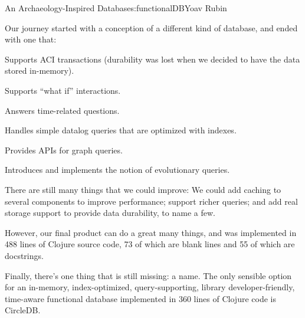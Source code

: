\begin{aosachapter}{An Archaeology-Inspired Database}{s:functionalDB}{Yoav Rubin}
\label{summary}

Our journey started with a conception of a different kind of database,
and ended with one that:

\begin{aosaitemize}

\item
  Supports ACI transactions (durability was lost when we decided to have
  the data stored in-memory).
\item
  Supports ``what if'' interactions.
\item
  Answers time-related questions.
\item
  Handles simple datalog queries that are optimized with indexes.
\item
  Provides APIs for graph queries.
\item
  Introduces and implements the notion of evolutionary queries.
\end{aosaitemize}

There are still many things that we could improve: We could add caching
to several components to improve performance; support richer queries;
and add real storage support to provide data durability, to name a few.

However, our final product can do a great many things, and was
implemented in 488 lines of Clojure source code, 73 of which are blank
lines and 55 of which are docstrings.

Finally, there's one thing that is still missing: a name. The only
sensible option for an in-memory, index-optimized, query-supporting,
library developer-friendly, time-aware functional database implemented
in 360 lines of Clojure code is CircleDB.

\end{aosachapter}
